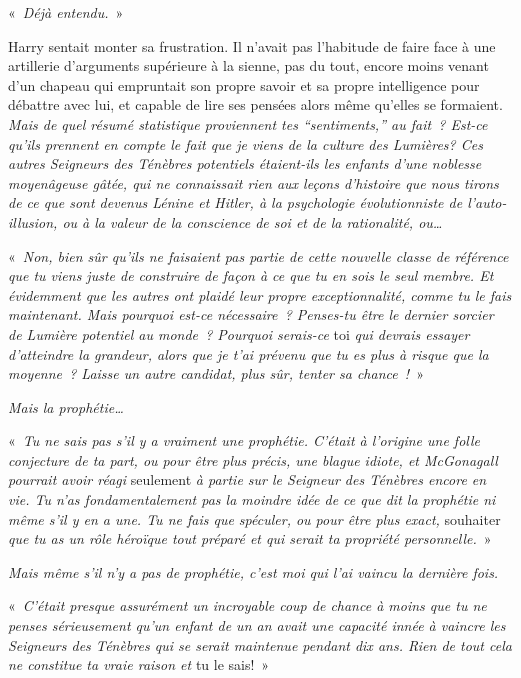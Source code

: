 «~\emph{Déjà entendu.}~»

Harry sentait monter sa frustration.
Il n'avait pas l'habitude de faire face à une artillerie d'arguments supérieure à la sienne, pas du tout, encore moins venant d'un chapeau qui empruntait son propre savoir et sa propre intelligence pour débattre avec lui, et capable de lire ses pensées alors même qu'elles se formaient.
\emph{Mais de quel résumé statistique proviennent tes “sentiments,” au fait~?
Est-ce qu'ils prennent en compte le fait que je viens de la culture des Lumières?
Ces autres Seigneurs des Ténèbres potentiels étaient-ils les enfants d'une noblesse moyenâgeuse gâtée, qui ne connaissait rien aux leçons d'histoire que nous tirons de ce que sont devenus Lénine et Hitler, à la psychologie évolutionniste de l'auto-illusion, ou à la valeur de la conscience de soi et de la rationalité, ou…}

«~\emph{Non, bien sûr qu'ils ne faisaient pas partie de cette nouvelle classe de référence que tu viens juste de construire de façon à ce que tu en sois le seul membre.
Et évidemment que les autres ont plaidé leur propre exceptionnalité, comme tu le fais maintenant.
Mais pourquoi est-ce nécessaire~?
Penses-tu être le dernier sorcier de Lumière potentiel au monde~?
Pourquoi serais-ce} toi \emph{qui devrais essayer d'atteindre la grandeur, alors que je t'ai prévenu que tu es plus à risque que la moyenne~?
Laisse un autre candidat, plus sûr, tenter sa chance~!}~»

\emph{Mais la prophétie…}

«~\emph{Tu ne sais pas s'il y a vraiment une prophétie.
C'était à l'origine une folle conjecture de ta part, ou pour être plus précis, une blague idiote, et McGonagall pourrait avoir réagi} seulement \emph{à partie sur le Seigneur des Ténèbres encore en vie.
Tu n'as fondamentalement pas la moindre idée de ce que dit la prophétie ni même s'il y en a une.
Tu ne fais que spéculer, ou pour être plus exact,} souhaiter \emph{que tu as un rôle héroïque tout préparé et qui serait ta propriété personnelle.}~»

\emph{Mais même s'il n'y a pas de prophétie, c'est moi qui l'ai vaincu la dernière fois.}

«~\emph{C'était presque assurément un incroyable coup de chance à moins que tu ne penses sérieusement qu'un enfant de un an avait une capacité innée à vaincre les Seigneurs des Ténèbres qui se serait maintenue pendant dix ans.
Rien de tout cela ne constitue ta vraie raison et} tu le sais!~»

